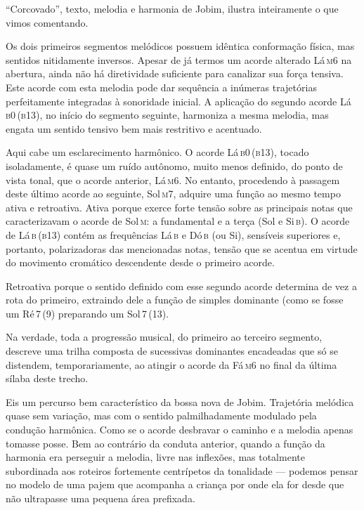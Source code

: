 ``Corcovado'', texto, melodia e harmonia de Jobim, ilustra inteiramente o
que vimos comentando.



Os dois primeiros segmentos melódicos possuem idêntica conformação
física, mas sentidos nitidamente inversos. Apesar de já termos um acorde
alterado Lá\,\textsc{m6} na abertura, ainda não há diretividade suficiente para
canalizar sua força tensiva. Este acorde com esta melodia pode dar
sequência a inúmeras trajetórias perfeitamente integradas à sonoridade
inicial. A aplicação do segundo acorde Lá\,\textsc{b0\,(b13)}, no início do
segmento seguinte, harmoniza a mesma melodia, mas engata um sentido
tensivo bem mais restritivo e acentuado.

Aqui cabe um esclarecimento harmônico. O acorde Lá\,\textsc{b0\,(b13)}, tocado
isoladamente, é quase um ruído autônomo, muito menos definido, do ponto
de vista tonal, que o acorde anterior, Lá\,\textsc{m6}. No entanto, procedendo à
passagem deste último acorde ao seguinte, Sol\,\textsc{m7}, adquire uma função ao
mesmo tempo ativa e retroativa. Ativa porque exerce forte tensão sobre
as principais notas que caracterizavam o acorde de Sol\,\textsc{m}: a fundamental e
a terça (Sol e Si\,\textsc{b}). O acorde de Lá\,\textsc{b\,(b13)} contém as frequências Lá\,\textsc{b} e
Dó\,\textsc{b} (ou Si), sensíveis superiores e, portanto, polarizadoras das
mencionadas notas, tensão que se acentua em virtude do movimento
cromático descendente desde o primeiro acorde. 



Retroativa porque o sentido definido com esse segundo acorde determina
de vez a rota do primeiro, extraindo dele a função de simples dominante
(como se fosse um Ré\,\textsc{7\,(9)} preparando um Sol\,\textsc{7\,(13)}.

Na verdade, toda a progressão musical, do primeiro ao terceiro segmento,
descreve uma trilha composta de sucessivas dominantes encadeadas que só
se distendem, temporariamente, ao atingir o acorde da Fá\,\textsc{m6} no final da
última sílaba deste trecho.


Eis um percurso bem característico da bossa nova de Jobim. Trajetória
melódica quase sem variação, mas com o sentido palmilhadamente modulado
pela condução harmônica. Como se o acorde desbravar o caminho e a
melodia apenas tomasse posse. Bem ao contrário da conduta anterior,
quando a função da harmonia era perseguir a melodia, livre nas
inflexões, mas totalmente subordinada aos roteiros fortemente
centrípetos da tonalidade --- podemos pensar no modelo de uma pajem que
acompanha a criança por onde ela for desde que não ultrapasse uma
pequena área prefixada.

